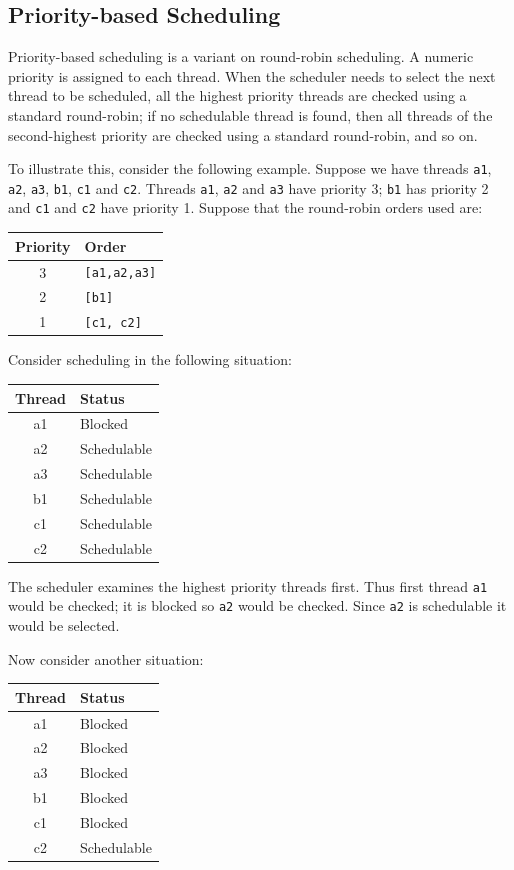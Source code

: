 \documentclass{overturerepchap}
\begin{document}
\subsection{Priority-based Scheduling}

Priority-based scheduling is a variant on round-robin scheduling. A
numeric priority is assigned to each thread. When the scheduler needs
to select the next thread to be scheduled, all the highest priority
threads are checked using a standard round-robin; if no schedulable
thread is found, then all threads of the second-highest priority are
checked using a standard round-robin, and so on.

To illustrate this, consider the following example. Suppose we have
threads \texttt{a1}, \texttt{a2}, \texttt{a3}, \texttt{b1},
\texttt{c1} and \texttt{c2}. Threads \texttt{a1}, \texttt{a2} and
\texttt{a3} have priority 3; \texttt{b1} has priority 2 and
\texttt{c1} and \texttt{c2} have priority 1. Suppose that the
round-robin orders used are:

\begin{tabular}{cl}
Priority & Order \\ \hline
3        & \texttt{[a1,a2,a3]} \\
2        & \texttt{[b1]} \\
1        & \texttt{[c1, c2]} \\
\end{tabular}

Consider scheduling in the following situation:

\begin{tabular}{cl}
Thread & Status \\ \hline
a1 & Blocked \\
a2 & Schedulable \\
a3 & Schedulable \\
b1 & Schedulable \\
c1 & Schedulable \\
c2 & Schedulable \\
\end{tabular}

The scheduler examines the highest priority threads first. Thus first
thread \texttt{a1} would be checked; it is blocked so \texttt{a2}
would be checked. Since \texttt{a2} is schedulable it would be
selected.

Now consider another situation:

\begin{tabular}{cl}
Thread & Status \\ \hline
a1 & Blocked \\
a2 & Blocked \\
a3 & Blocked\\
b1 & Blocked\\
c1 & Blocked\\
c2 & Schedulable\\
\end{tabular}
\end{document}
